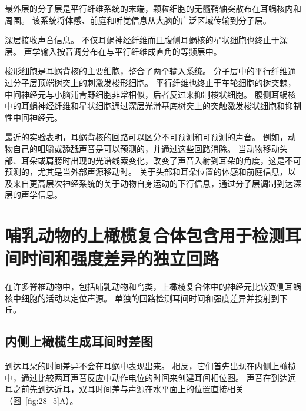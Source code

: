最外层的分子层是平行纤维系统的末端，颗粒细胞的无髓鞘轴突散布在耳蜗核内和周围。
该系统将体感、前庭和听觉信息从大脑的广泛区域传输到分子层。


深层接收声音信息。
不仅耳蜗神经纤维而且腹侧耳蜗核的星状细胞也终止于深层。
声学输入按音调分布在与平行纤维成直角的等频层中。


梭形细胞是耳蜗背核的主要细胞，整合了两个输入系统。
分子层中的平行纤维通过分子层顶端树突上的刺激发梭形细胞。
平行纤维也终止于车轮细胞的树突棘，中间神经元与小脑浦肯野细胞非常相似，后者反过来抑制梭状细胞。
腹侧耳蜗核中的耳蜗神经纤维和星状细胞通过深层光滑基底树突上的突触激发梭状细胞和抑制性中间神经元。


最近的实验表明，耳蜗背核的回路可以区分不可预测和可预测的声音。
例如，动物自己的咀嚼或舔舐声音是可以预测的，并通过这些回路消除。
当动物移动头部、耳朵或肩膀时出现的光谱线索变化，改变了声音入射到耳朵的角度，这是不可预测的，尤其是当外部声源移动时。
关于头部和耳朵位置的体感和前庭信息，以及来自更高层次神经系统的关于动物自身运动的下行信息，通过分子层调制到达深层的声学信息。



\section{哺乳动物的上橄榄复合体包含用于检测耳间时间和强度差异的独立回路}

在许多脊椎动物中，包括哺乳动物和鸟类，上橄榄复合体中的神经元比较双侧耳蜗核中细胞的活动以定位声源。
单独的回路检测耳间时间和强度差异并投射到下丘。



\subsection{内侧上橄榄生成耳间时差图}

到达耳朵的时间差异不会在耳蜗中表现出来。
相反，它们首先出现在内侧上橄榄中，通过比较两耳声音反应中动作电位的时间来创建耳间相位图。
声音在到达远耳之前先到达近耳，双耳时间差与声源在水平面上的位置直接相关（图~\ref{fig:28_5}A）。



